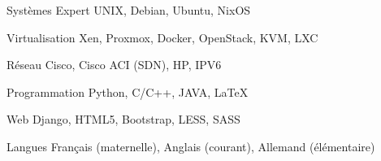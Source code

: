 

\begin{cvskills}

  \cvskill
    {Systèmes} %
    {Expert UNIX, Debian, Ubuntu, NixOS} %


  \cvskill
    {Virtualisation } %
    {Xen, Proxmox, Docker, OpenStack, KVM, LXC} %


  \cvskill
    {Réseau} %
	{Cisco, Cisco ACI (SDN), HP, IPV6} %


  \cvskill
    {Programmation} %
    {Python, C/C++, JAVA, LaTeX} %

  \cvskill
    {Web} %
    {Django, HTML5, Bootstrap, LESS, SASS} %

  \cvskill
    {Langues} %
    {Français (maternelle), Anglais (courant), Allemand (élémentaire)} %

\end{cvskills}

